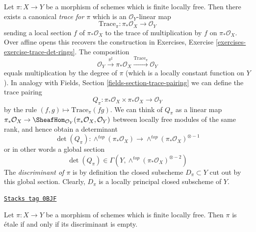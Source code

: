 \medskip\noindent
Let $\pi : X \to Y$ be a morphism of schemes which is finite locally
free. Then there exists a canonical {\it trace for $\pi$}
which is an $\mathcal{O}_Y$-linear map
$$
\text{Trace}_\pi : \pi_*\mathcal{O}_X \longrightarrow \mathcal{O}_Y
$$
sending a local section $f$ of $\pi_*\mathcal{O}_X$ to the
trace of multiplication by $f$ on $\pi_*\mathcal{O}_X$. Over
affine opens this recovers the construction in
Exercises, Exercise \ref{exercises-exercise-trace-det-rings}.
The composition
$$
\mathcal{O}_Y \xrightarrow{\pi^\sharp} \pi_*\mathcal{O}_X
\xrightarrow{\text{Trace}_\pi} \mathcal{O}_Y
$$
equals multiplication by the degree of $\pi$ (which is a locally constant
function on $Y$). In analogy with
Fields, Section \ref{fields-section-trace-pairing}
we can define the trace pairing
$$
Q_\pi :
\pi_*\mathcal{O}_X \times \pi_*\mathcal{O}_X
\longrightarrow
\mathcal{O}_Y
$$
by the rule $(f, g) \mapsto \text{Trace}_\pi(fg)$. We can think of
$Q_\pi$ as a linear map
$\pi_*\mathcal{O}_X \to
\SheafHom_{\mathcal{O}_Y}(\pi_*\mathcal{O}_X, \mathcal{O}_Y)$
between locally free modules of the same rank, and hence obtain
a determinant
$$
\det(Q_\pi) :
\wedge^{top}(\pi_*\mathcal{O}_X)
\longrightarrow
\wedge^{top}(\pi_*\mathcal{O}_X)^{\otimes -1}
$$
or in other words a global section
$$
\det(Q_\pi) \in \Gamma(Y, \wedge^{top}(\pi_*\mathcal{O}_X)^{\otimes -2})
$$
The {\it discriminant of $\pi$} is by definition the closed
subscheme $D_\pi \subset Y$ cut out by this global section.
Clearly, $D_\pi$ is a locally principal closed subscheme of $Y$.

\begin{lemma}[Discriminant]
\label{discriminant-lemma-discriminant}
\href{https://stacks.math.columbia.edu/tag/0BJF}{\texttt{Stacks tag 0BJF}}

Let $\pi : X \to Y$ be a morphism of schemes which is finite locally
free. Then $\pi$ is \'etale if and only if its discriminant is empty.
\end{lemma}

